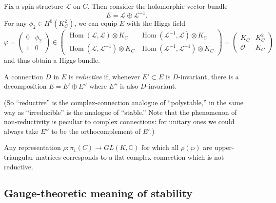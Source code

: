 \documentclass[12pt,letterpaper,reqno]{article}
\numberwithin{equation}{section}
\newcommand{\cL}{\ensuremath{\mathcal L}}
\newcommand{\cO}{\ensuremath{\mathcal O}}
\newcommand{\C}{\ensuremath{\mathbb C}}
\newcommand{\ti}[1]{\textit{#1}}
\DeclareMathOperator{\Hom}{Hom}
\begin{document}
\begin{example} \label{exa:hitchin-section-SL2} 
Fix a spin structure
$\cL$ on $C$.
Then consider the holomorphic vector
bundle
\begin{equation}
  E = \cL \oplus \cL^{-1}.
\end{equation}
For any $\phi_2 \in H^0(K_C^2)$,
we can equip $E$ with the Higgs field
\begin{equation}
  \varphi = \begin{pmatrix} 0 & \phi_2 \\ 1 & 0 \end{pmatrix} \in \begin{pmatrix} \Hom(\cL,\cL) \otimes K_C & \Hom(\cL^{-1},\cL) \otimes K_C \\ \Hom(\cL,\cL^{-1}) \otimes K_C & \Hom(\cL^{-1},\cL^{-1}) \otimes K_C \end{pmatrix} = \begin{pmatrix} K_C & K_C^2 \\ \cO & K_C \end{pmatrix}
\end{equation}
and thus obtain a Higgs bundle.
\end{example}



\begin{defn} A connection $D$ in $E$
is \ti{reductive} if, whenever $E' \subset E$ is $D$-invariant,
there is a decomposition $E = E' \oplus E''$ where $E''$ is
also $D$-invariant. 
\end{defn}

(So ``reductive'' is the complex-connection analogue of ``polystable,''
in the same way as ``irreducible'' is the analogue of ``stable.'' 
Note that the phenomenon of non-reductivity 
is peculiar to complex connections: for 
unitary ones we could always take $E''$ to be the orthocomplement
of $E'$.)

\begin{example}
Any representation $\rho: \pi_1(C) \to GL(K,\C)$ for which all
$\rho(\wp)$ are upper-triangular matrices
corresponds to a flat complex connection which is not reductive.
\end{example}

\subsection{Gauge-theoretic meaning of stability}
\end{document}
